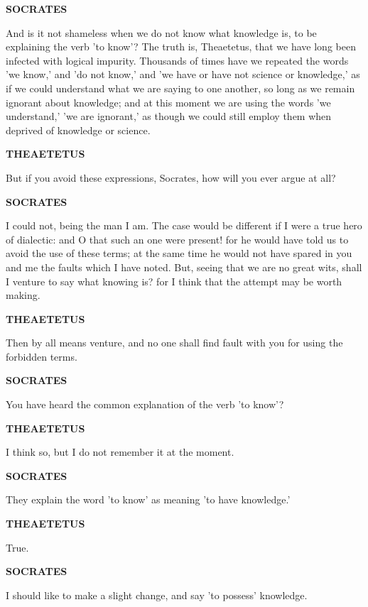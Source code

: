 \documentclass[11pt,letter]{article}
\begin{document}
\par \textbf{SOCRATES}
\par   And is it not shameless when we do not know what knowledge is, to be explaining the verb 'to know'? The truth is, Theaetetus, that we have long been infected with logical impurity. Thousands of times have we repeated the words 'we know,' and 'do not know,' and 'we have or have not science or knowledge,' as if we could understand what we are saying to one another, so long as we remain ignorant about knowledge; and at this moment we are using the words 'we understand,' 'we are ignorant,' as though we could still employ them when deprived of knowledge or science.

\par \textbf{THEAETETUS}
\par   But if you avoid these expressions, Socrates, how will you ever argue at all?

\par \textbf{SOCRATES}
\par   I could not, being the man I am. The case would be different if I were a true hero of dialectic:  and O that such an one were present! for he would have told us to avoid the use of these terms; at the same time he would not have spared in you and me the faults which I have noted. But, seeing that we are no great wits, shall I venture to say what knowing is? for I think that the attempt may be worth making.

\par \textbf{THEAETETUS}
\par   Then by all means venture, and no one shall find fault with you for using the forbidden terms.

\par \textbf{SOCRATES}
\par   You have heard the common explanation of the verb 'to know'?

\par \textbf{THEAETETUS}
\par   I think so, but I do not remember it at the moment.

\par \textbf{SOCRATES}
\par   They explain the word 'to know' as meaning 'to have knowledge.'

\par \textbf{THEAETETUS}
\par   True.

\par \textbf{SOCRATES}
\par   I should like to make a slight change, and say 'to possess' knowledge.
\end{document}
